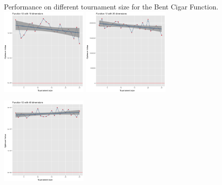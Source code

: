\documentclass[portrait,final,a0paper,fontscale=0.277]{baposter}
\begin{document}
\begin{poster}
{\begin{center}
				\large{Performance on different tournament size for the Bent Cigar Function.}\\
				\raggedleft
				\includegraphics[width=0.32\textwidth]{12dim_10.png}
				\centering
				\includegraphics[width=0.32\textwidth]{12dim_20.png}
				\raggedright
				\includegraphics[width=0.32\textwidth]{12dim_40.png}
				

\end{center}}
\end{poster}
\end{document}
